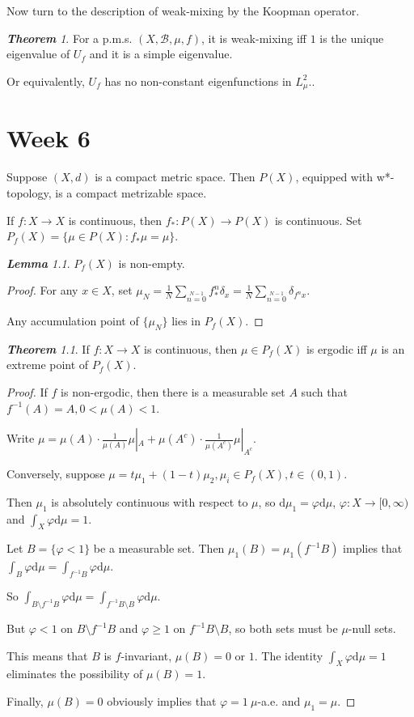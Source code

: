 \documentclass[10pt, a4paper, oneside]{report}
\numberwithin{equation}{chapter}
\theoremstyle{remark}
\newtheorem{theorem}[definition]{\bf{Theorem}}
\newtheorem{lemma}[definition]{\bf{Lemma}}
\theoremstyle{remark}
\begin{document}
Now turn to the description of weak-mixing by the Koopman operator.

\begin{theorem}
    For a p.m.s. $(X,\mathcal{B},\mu,f)$, it is weak-mixing iff $1$ is the unique eigenvalue of $U_f$ and it is a simple eigenvalue.

    Or equivalently, $U_f$ has no non-constant eigenfunctions in $L_\mu^2.$.
\end{theorem}

\chapter{Week 6}
Suppose $(X,d)$ is a compact metric space. Then $P(X)$, equipped with w*-topology, is a compact metrizable space.

If $f:X\rightarrow X$ is continuous, then $f_*:P(X)\rightarrow P(X)$ is continuous. Set $P_f(X)=\{\mu\in P(X):f_*\mu=\mu\}$.

\begin{lemma}
    $P_f(X)$ is non-empty.
\end{lemma}

\begin{proof}
    For any $x\in X$, set $\mu_N=\frac{1}{N}\sum\limits_{n=0}\limits^{N-1}f_*^n\delta_x=\frac{1}{N}\sum\limits_{n=0}\limits^{N-1}\delta_{f^nx}$.

    Any accumulation point of $\{\mu_N\}$ lies in $P_f(X)$.
\end{proof}

\begin{theorem}
    If $f:X\rightarrow X$ is continuous, then $\mu\in P_f(X)$ is ergodic iff $\mu$ is an extreme point of $P_f(X)$.
\end{theorem}

\begin{proof}
    If $f$ is non-ergodic, then there is a measurable set $A$ such that $f^{-1}(A)=A,0<\mu(A)<1$.

    Write $\mu=\mu(A)\cdot\frac{1}{\mu(A)}\mu|_A+\mu(A^c)\cdot\frac{1}{\mu(A^c)}\mu|_{A^c}$.

    Conversely, suppose $\mu=t\mu_1+(1-t)\mu_2,\mu_i\in P_f(X),t\in(0,1)$.

    Then $\mu_1$ is absolutely continuous with respect to $\mu$, so $\mathrm{d}\mu_1=\varphi\mathrm{d}\mu$, $\varphi:X\rightarrow [0,\infty)$ and $\int_X\varphi\mathrm{d}\mu=1$.

    Let $B=\{\varphi<1\}$ be a measurable set. Then $\mu_1(B)=\mu_1(f^{-1}B)$ implies that $\int_B\varphi\mathrm{d}\mu=\int_{f^{-1}B}\varphi\mathrm{d}\mu$.

    So $\int_{B\setminus f^{-1}B}\varphi\mathrm{d}\mu=\int_{f^{-1}B\setminus B}\varphi\mathrm{d}\mu$.

    But $\varphi<1$ on $B\setminus f^{-1}B$ and $\varphi\geqslant 1$ on $f^{-1}B\setminus B$, so both sets must be $\mu$-null sets.

    This means that $B$ is $f$-invariant, $\mu(B)=0$ or $1$. The identity $\int_X\varphi \mathrm{d}\mu=1$ eliminates the possibility of $\mu(B)=1$.

    Finally, $\mu(B)=0$ obviously implies that $\varphi=1~\mu$-a.e. and $\mu_1=\mu$.
\end{proof}
\end{document}

